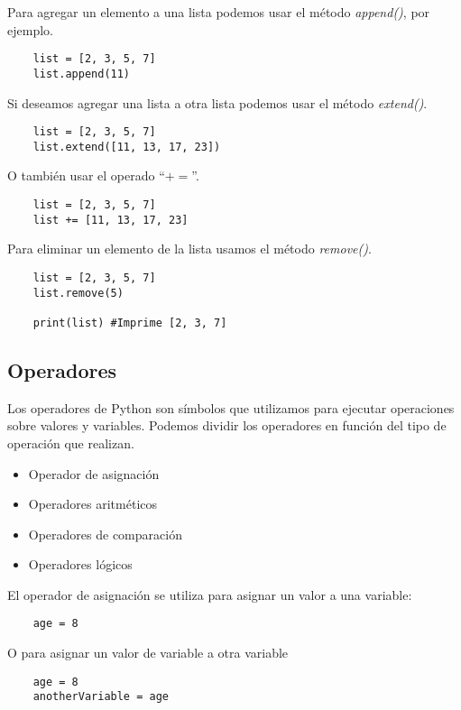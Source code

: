 \documentclass[12pt]{article}
\theoremstyle{definition}
\begin{document}
    Para agregar un elemento a una lista podemos usar el método \textit{append()}, por ejemplo.
    \begin{lstlisting}
    list = [2, 3, 5, 7]
    list.append(11)
    \end{lstlisting}

    Si deseamos agregar una lista a otra lista podemos usar el método \textit{extend()}.
    \begin{lstlisting}
    list = [2, 3, 5, 7]
    list.extend([11, 13, 17, 23])
    \end{lstlisting}

    O también usar el operado ``$+=$''.
    \begin{lstlisting}
    list = [2, 3, 5, 7]
    list += [11, 13, 17, 23]
    \end{lstlisting}

    Para eliminar un elemento de la lista usamos el método \textit{remove()}.
    \begin{lstlisting}
    list = [2, 3, 5, 7]
    list.remove(5)

    print(list) #Imprime [2, 3, 7]
    \end{lstlisting}


    \newpage

    \subsection{Operadores}

    Los operadores de Python son símbolos que utilizamos para ejecutar operaciones sobre valores y  variables.
    Podemos dividir los operadores en función del tipo de operación que realizan.
    \begin{itemize}
        \item Operador de asignación
        \item Operadores aritméticos
        \item Operadores de comparación
        \item Operadores lógicos
    \end{itemize}

    El operador de asignación se utiliza para asignar un valor a una variable:
    \begin{lstlisting}
    age = 8
    \end{lstlisting}
    O para asignar un valor de variable a otra variable
    \begin{lstlisting}
    age = 8
    anotherVariable = age
    \end{lstlisting}
\end{document}
